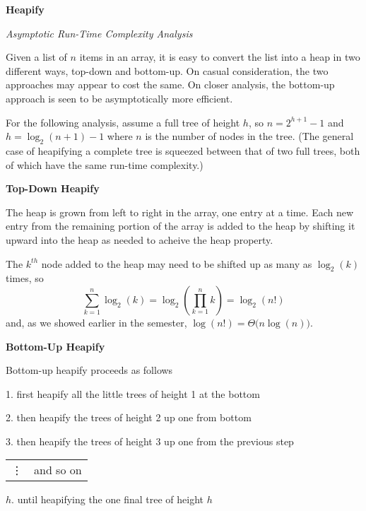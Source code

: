 \documentclass{article}
\begin{document}
{\Large\bf Heapify}

{\large\it Asymptotic Run-Time Complexity Analysis}

\vspace{1pc}
Given a list of $n$ items in an array, it is easy to convert the list into a
heap in two different ways, top-down and bottom-up. On casual consideration,
the two approaches may appear to cost the same. On closer analysis, the
bottom-up approach is seen to be asymptotically more efficient.

\vspace{1pc}
For the following analysis,
assume a full tree of height $h$,
so $n=2^{h+1}-1$ and $h=\log_2(n+1) - 1$
where $n$ is the number of nodes in the tree.
(The general case of heapifying a complete tree is squeezed between that of two
full trees, both of which have the same run-time complexity.)

\vspace{1pc}
{\large\bf Top-Down Heapify}

\vspace{1pc}
The heap is grown from left to right in the array, one entry at a time.
Each new entry from the remaining portion of the array is added to the heap
by shifting it upward into the heap as needed to acheive the heap property.

\vspace{1pc}
The $k^{th}$ node added to the heap may need to be shifted up as many as
$\log_2(k)$ times, so
\[
  \sum_{k=1}^{n} \log_2(k)
=
  \log_2\left(\prod_{k=1}^{n} k\right)
=
  \log_2(n!)
\]
and, as we showed earlier in the semester, $\log(n!)=\Theta\big(n\log(n)\big)$.

\vspace{1pc}
{\large\bf Bottom-Up Heapify}

\vspace{1pc}
Bottom-up heapify proceeds as follows

\vspace{1pc}
1. first heapify all the little trees of height 1 at the bottom

2. then heapify the trees of height 2 up one from bottom

3. then heapify the trees of height 3 up one from the previous step

\begin{tabular}{ll}
\vdots & and so on \\
\end{tabular}

\vspace{0.5pc}
$h$. until heapifying the one final tree of height $h$
\end{document}
